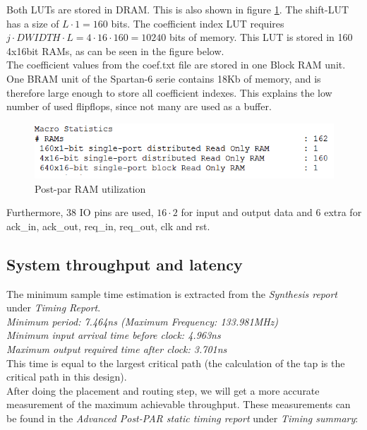 \documentclass[a4paper,twoside,11pt, fleqn]{article}
\begin{document}
Both LUTs are stored in DRAM. This is also shown in figure \ref{fig:RAM}. The shift-LUT has a size of $L\cdot 1 = 160$ bits. The coefficient index LUT requires $j\cdot DWIDTH\cdot L = 4\cdot 16 \cdot 160 = 10240$ bits of memory. This LUT is stored in 160 4x16bit RAMs, as can be seen in the figure below.\\ 

The coefficient values from the coef.txt file are stored in one Block RAM unit. One BRAM  unit of the Spartan-6 serie contains 18Kb of memory, and is therefore large enough to store all coefficient indexes. This explains the low number of used flipflops, since not many are used as a buffer.

\begin{figure}[h]
	\includegraphics[scale = 0.9]{Images/simulation_missingregisters}
    \caption{Post-par RAM utilization}
    \label{fig:RAM}
\end{figure}

Furthermore, 38 IO pins are used, $16\cdot 2$ for input and output data and 6 extra for ack\_in, ack\_out, req\_in, req\_out, clk and rst.

\newpage
\subsection{System throughput and latency}
\label{sec:thr4}
The minimum sample time estimation is extracted from the \textit{Synthesis report} under \textit{Timing Report}.\\

   \textit{Minimum period:  7.464ns (Maximum Frequency: 133.981MHz)\\
   Minimum input arrival time before clock: 4.963ns\\
   Maximum output required time after clock: 3.701ns}\\

This time is equal to the largest critical path (the calculation of the tap is the critical path in this design).\\

After doing the placement and routing step, we will get a more accurate measurement of the maximum achievable throughput. These measurements can be found in the \textit{Advanced Post-PAR static timing report} under \textit{Timing summary}:\\
\end{document}
